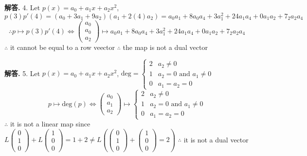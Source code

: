 \documentclass[12pt, a4paper, oneside]{article}
\newenvironment{solution}{\par\noindent\textbf{解答. }}{\par}
\begin{document}
\begin{CJK}{UTF8}{gbsn}
\begin{solution}
  4. Let $p(x) = a_0 + a_1x + a_2x^2$, $p(3)p'(4) = (a_0+3a_1+9a_2)(a_1+2(4)a_2) =a_0a_1+8a_0a_4+3a_1^2+24a_1a_4+0a_1a_2+7_2a_2a_4$
  $$ \therefore p \mapsto p(3)p'(4) \Leftrightarrow \begin{pmatrix}
    a_0 \\ a_0 \\ a_2 
  \end{pmatrix} \mapsto a_0a_1+8a_0a_4+3a_1^2+24a_1a_4+0a_1a_2+7_2a_2a_4$$
  $\therefore$ it cannot be equal to a row veector
  $\therefore$ the map is not a dual vector
\end{solution}

\begin{solution}
  5. Let $p(x) = a_0 + a_1x + a_2x^2$, $\text{deg} = \begin{cases}
    2 & a_2\neq0 \\
    1 & a_2=0 \text{ and } a_1\neq 0 \\
    0 & a_1=a_2=0 
  \end{cases}$ 
  $$ p \mapsto \text{deg}(p) \Leftrightarrow \begin{pmatrix}
    a_0 \\ a_1 \\ a_2
  \end{pmatrix} \mapsto \begin{cases}
    2 & a_2\neq0 \\
    1 & a_2=0 \text{ and } a_1\neq 0 \\
    0 & a_1=a_2=0 
  \end{cases}$$
  $\therefore$ it is not a linear map since $L\begin{pmatrix}
    0 \\ 1 \\ 0
  \end{pmatrix} + L \begin{pmatrix}
    1 \\ 0 \\ 0 
  \end{pmatrix} = 1 + 2 \neq L\left(\begin{pmatrix}
      0 \\ 1 \\ 0
  \end{pmatrix} + \begin{pmatrix}
    1 \\ 0 \\ 0
  \end{pmatrix} = 2\right)$ \newline
  $\therefore$ it is not a dual vector
\end{solution}


\end{CJK}
\end{document}
